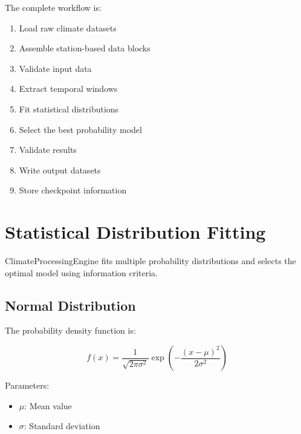 \documentclass[11pt,a4paper]{article}
\begin{document}
The complete workflow is:


\begin{enumerate}

\item Load raw climate datasets

\item Assemble station-based data blocks

\item Validate input data

\item Extract temporal windows

\item Fit statistical distributions

\item Select the best probability model

\item Validate results

\item Write output datasets

\item Store checkpoint information

\end{enumerate}




\section{Statistical Distribution Fitting}


ClimateProcessingEngine fits multiple probability distributions and selects
the optimal model using information criteria.



\subsection{Normal Distribution}


The probability density function is:


\begin{equation}

f(x)=
\frac{1}{\sqrt{2\pi\sigma^2}}
\exp
\left(
-\frac{(x-\mu)^2}{2\sigma^2}
\right)

\end{equation}



Parameters:


\begin{itemize}

\item $\mu$: Mean value

\item $\sigma$: Standard deviation

\end{itemize}
\end{document}
